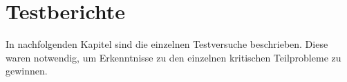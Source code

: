\section{Testberichte}
In nachfolgenden Kapitel sind die einzelnen Testversuche beschrieben. 
Diese waren notwendig, um Erkenntnisse zu den einzelnen kritischen 
Teilprobleme zu gewinnen.